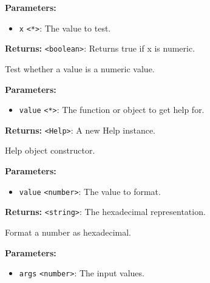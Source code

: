 \documentclass[12pt,a4paper]{article}
\begin{document}
\vspace{5mm}
\noindent {}


\noindent \textbf{Parameters:}
\begin{itemize}
  \item \texttt{x} \texttt{<*>}: The value to test.
\end{itemize}

\noindent \textbf{Returns:} \texttt{<boolean>}: Returns true if x is numeric.

\noindent Test whether a value is a numeric value.

\vspace{5mm}
\noindent {}


\noindent \textbf{Parameters:}
\begin{itemize}
  \item \texttt{value} \texttt{<*>}: The function or object to get help for.
\end{itemize}

\noindent \textbf{Returns:} \texttt{<Help>}: A new Help instance.

\noindent Help object constructor.

\vspace{5mm}
\noindent {}


\noindent \textbf{Parameters:}
\begin{itemize}
  \item \texttt{value} \texttt{<number>}: The value to format.
\end{itemize}

\noindent \textbf{Returns:} \texttt{<string>}: The hexadecimal representation.

\noindent Format a number as hexadecimal.

\vspace{5mm}
\noindent {}


\noindent \textbf{Parameters:}
\begin{itemize}
  \item \texttt{args} \texttt{<number>}: The input values.
\end{itemize}
\end{document}

